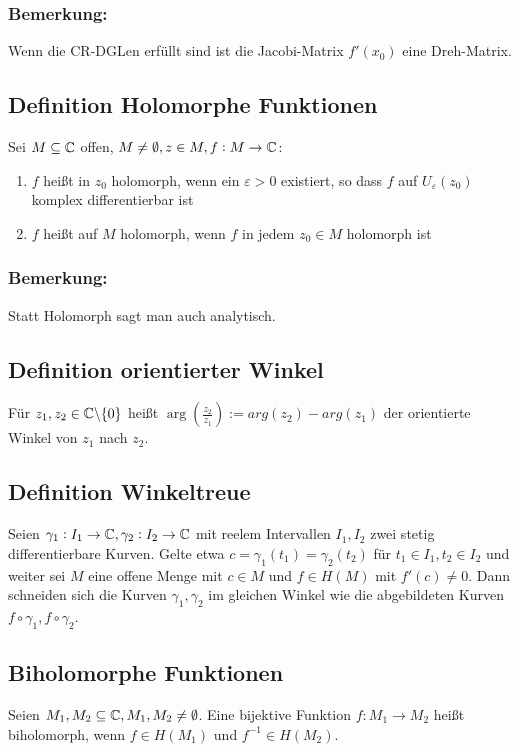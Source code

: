 \subsubsection{Bemerkung:}
Wenn die CR-DGLen erfüllt sind ist die Jacobi-Matrix $f'(x_0)$ eine Dreh-Matrix.

\subsection{Definition Holomorphe Funktionen}
Sei $M \subseteq \mathbb{C}$ offen, $M \neq \emptyset, z \in M, f: M \to \mathbb{C}$:
\begin{enumerate}
    \item $f$ heißt in $z_0$ holomorph, wenn ein $\varepsilon > 0$ existiert, so dass $f$ auf $U_\varepsilon(z_0)$
        komplex differentierbar ist
    \item $f$ heißt auf $M$ holomorph, wenn $f$ in jedem $z_0 \in M$ holomorph ist
\end{enumerate}

\subsubsection{Bemerkung:}
Statt Holomorph sagt man auch analytisch.

\subsection{Definition orientierter Winkel}
Für $z_1, z_2 \in \mathbb{C} \backslash \{0\}$ heißt $\arg(\frac{z_2}{z_1}) := arg(z_2) - arg(z_1)$ der orientierte Winkel
von $z_1$ nach $z_2$.

\subsection{Definition Winkeltreue}
Seien $\gamma_1: I_1 \to \mathbb{C}, \gamma_2: I_2 \to \mathbb{C}$ mit reelem Intervallen $I_1, I_2$ zwei stetig differentierbare
Kurven. Gelte etwa $c = \gamma_1(t_1) = \gamma_2(t_2)$ für $t_1 \in I_1, t_2 \in I_2$ und weiter sei $M$ eine
offene Menge mit $c \in M$ und $f \in H(M)$ mit $f'(c) \neq 0$. Dann schneiden sich die Kurven $\gamma_1, \gamma_2$
im gleichen Winkel wie die abgebildeten Kurven $f \circ \gamma_1, f \circ \gamma_2$.

\subsection{Biholomorphe Funktionen}
Seien $M_1, M_2 \subseteq \mathbb{C}, M_1, M_2 \neq \emptyset$. Eine bijektive Funktion $f: M_1 \to M_2$ heißt biholomorph,
wenn $f \in H(M_1)$ und $f^{-1} \in H(M_2)$.

